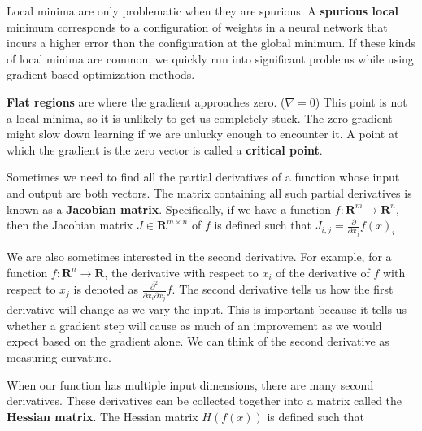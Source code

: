 \documentclass{report}
\begin{document}
Local minima are only problematic when they are spurious. A \textbf{spurious local} minimum corresponds to a configuration of weights in a neural network that incurs a higher error than the configuration at the global minimum. If these kinds of local minima are common, we quickly run into significant problems while using gradient based optimization methods.

\textbf{Flat regions} are where the gradient approaches zero. ($\nabla = 0$) This point is not a local minima, so it is unlikely to get us completely stuck. The zero gradient might slow down learning if we are unlucky enough to encounter it. A point at which the gradient is the zero vector is called a \textbf{critical point}.

Sometimes we need to ﬁnd all the partial derivatives of a function whose input and output are both vectors. The matrix containing all such partial derivatives is known as a \textbf{Jacobian matrix}. Speciﬁcally, if we have a function $f : \mathbf{R}^m \rightarrow \mathbf{R}^n$, then the Jacobian matrix $J \in \mathbf{R}^{m \times n}$ of $f$ is deﬁned such that $J_{i,j} = \frac{\partial}{\partial x_j}f(x)_i$

We are also sometimes interested in the second derivative. For example, for a function $f : \mathbf{R}^n \rightarrow \mathbf{R}$, the derivative with respect to $x_i$ of the derivative of $f$ with respect to $x_j$ is denoted as $\frac{\partial^2}{\partial x_i \partial x_j}f$. The second derivative tells us how the ﬁrst derivative will change as we vary the input. This is important because it tells us whether a gradient step will cause as much of an improvement as we would expect based on the gradient alone. We can think of the second derivative as measuring curvature.

When our function has multiple input dimensions, there are many second derivatives. These derivatives can be collected together into a matrix called the \textbf{Hessian matrix}. The Hessian matrix $H(f(x))$ is defined such that
\end{document}
